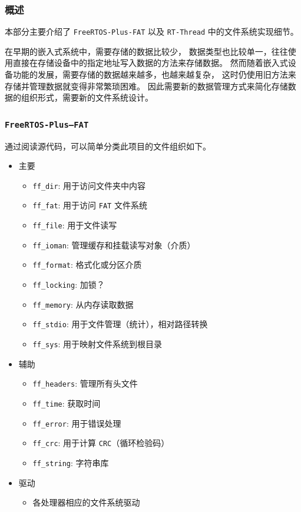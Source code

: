 \documentclass[UTF8,a4paper]{ctexart}
\begin{document}
\subsubsection{概述}
本部分主要介绍了 \texttt{FreeRTOS-Plus-FAT} 以及 \texttt{RT-Thread} 
中的文件系统实现细节。

在早期的嵌入式系统中，需要存储的数据比较少，
数据类型也比较单一，往往使用直接在存储设备中的指定地址写入数据的方法来存储数据。
然而随着嵌入式设备功能的发展，需要存储的数据越来越多，也越来越复杂，
这时仍使用旧方法来存储并管理数据就变得非常繁琐困难。
因此需要新的数据管理方式来简化存储数据的组织形式，需要新的文件系统设计。

\subsubsection{\texttt{FreeRTOS-Plus—FAT}}
通过阅读源代码，可以简单分类此项目的文件组织如下。
\begin{itemize}
\item 主要
\begin{itemize}
    \item \texttt{ff\_dir}: 用于访问文件夹中内容
    \item \texttt{ff\_fat}: 用于访问 \texttt{FAT} 文件系统
    \item \texttt{ff\_file}: 用于文件读写
    \item \texttt{ff\_ioman}: 管理缓存和挂载读写对象（介质）
    \item \texttt{ff\_format}: 格式化或分区介质
    \item \texttt{ff\_locking}: 加锁？
    \item \texttt{ff\_memory}: 从内存读取数据
    \item \texttt{ff\_stdio}: 用于文件管理（统计），相对路径转换
    \item \texttt{ff\_sys}: 用于映射文件系统到根目录
\end{itemize}
\item 辅助
\begin{itemize}
    \item \texttt{ff\_headers}: 管理所有头文件
    \item \texttt{ff\_time}: 获取时间
    \item \texttt{ff\_error}:  用于错误处理
    \item \texttt{ff\_crc}: 用于计算 \texttt{CRC}（循环检验码）
    \item \texttt{ff\_string}: 字符串库
\end{itemize}
\item 驱动
\begin{itemize}
    \item 各处理器相应的文件系统驱动
\end{itemize}
\end{itemize}
\end{document}
